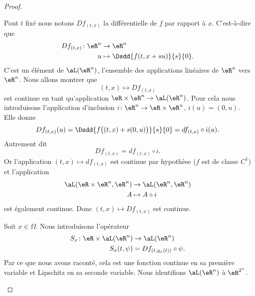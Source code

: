 \begin{proof}
	\begin{subproof}
		Pout \( t\) fixé nous notons \( Df_{(t,x)}\) la différentielle de \( f\) par rapport à \( x\). C'est-à-dire que
		\begin{equation}
			\begin{aligned}
				Df_{(t,x)}\colon \eR^n & \to \eR^n                         \\
				u                      & \mapsto \Dsdd{ f(t,x+su) }{s}{0}.
			\end{aligned}
		\end{equation}
		C'est un élément de \( \aL(\eR^n)\), l'ensemble des applications linéaires de \( \eR^n\) vers \( \eR^n\). Nous allons montrer que
		\begin{equation}
			(t,x)\mapsto Df_{(t,x)}
		\end{equation}
		est continue en tant qu'application \( \eR\times \eR^n\to\aL(\eR^n)\). Pour cela nous introduisons l'application d'inclusion \( i\colon \eR^n\to \eR\times \eR^n\), \( i(u)=(0,u)\). Elle donne
		\begin{equation}
			Df_{(t,x)}(u)=\Dsdd{ f\big( (t,x)+s(0,u) \big) }{s}{0}=df_{(t,x)}\circ i (u).
		\end{equation}
		Autrement dit
		\begin{equation}
			Df_{(t,x)}=df_{(t,x)}\circ i.
		\end{equation}
		Or l'application \( (t,x)\mapsto df_{(t,x)} \) est continue par hypothèse (\( f\) est de classe \( C^1\)) et l'application
		\begin{equation}        \label{EQooZTAPooCduWcl}
			\begin{aligned}
				\aL(\eR\times \eR^n,\eR^n) & \to \aL(\eR^n,\eR^n) \\
				A                          & \mapsto A\circ i
			\end{aligned}
		\end{equation}
		est également continue. Donc \( (t,x)\mapsto Df_{(t,x)}\) est continue.


		Soit \( x\in \Omega\). Nous introduisons l'opérateur
		\begin{equation}
			\begin{aligned}
				S_x\colon \eR\times \aL(\eR^n) & \to \aL(\eR^n)              \\
				S_x(t,\psi)                    & =Df_{(t,y_x(t))}\circ \psi.
			\end{aligned}
		\end{equation}
		Par ce que nous avons raconté, cela est une fonction continue en sa première variable et Lipschitz en sa seconde variable. Nous identifions \( \aL(\eR^n)\) à \( \eR^{2^n}\).


\end{subproof}
\end{proof}
